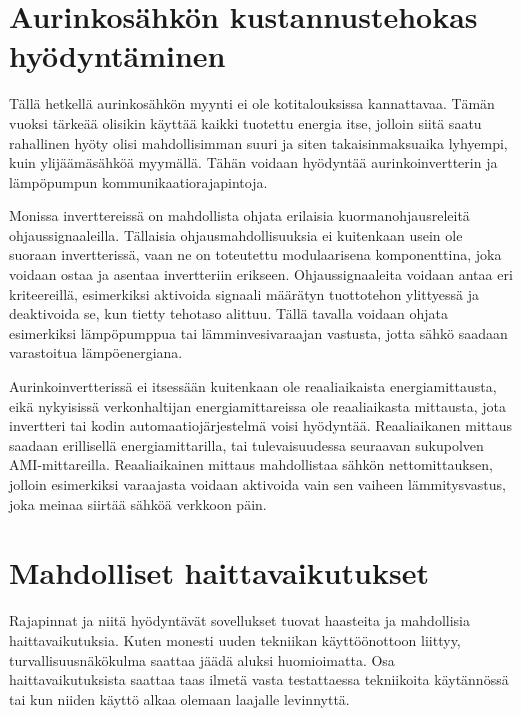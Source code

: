 \section{Aurinkosähkön kustannustehokas hyödyntäminen}

  Tällä hetkellä aurinkosähkön myynti ei ole kotitalouksissa kannattavaa. Tämän vuoksi tärkeää olisikin käyttää kaikki tuotettu energia itse, jolloin siitä saatu rahallinen hyöty olisi mahdollisimman suuri ja siten takaisinmaksuaika lyhyempi, kuin ylijäämäsähköä myymällä. Tähän voidaan hyödyntää aurinkoinvertterin ja lämpöpumpun kommunikaatiorajapintoja.

  Monissa inverttereissä on mahdollista ohjata erilaisia kuormanohjausreleitä ohjaussignaaleilla. Tällaisia ohjausmahdollisuuksia ei kuitenkaan usein ole suoraan invertterissä, vaan ne on toteutettu modulaarisena komponenttina, joka voidaan ostaa ja asentaa invertteriin erikseen. Ohjaussignaaleita voidaan antaa eri kriteereillä, esimerkiksi aktivoida signaali määrätyn tuottotehon ylittyessä ja deaktivoida se, kun tietty tehotaso alittuu. Tällä tavalla voidaan ohjata esimerkiksi lämpöpumppua tai lämminvesivaraajan vastusta, jotta sähkö saadaan varastoitua lämpöenergiana.

  Aurinkoinvertterissä ei itsessään kuitenkaan ole reaaliaikaista energiamittausta, eikä nykyisissä verkonhaltijan energiamittareissa ole reaaliaikasta mittausta, jota invertteri tai kodin automaatiojärjestelmä voisi hyödyntää. Reaaliaikanen mittaus saadaan erillisellä energiamittarilla, tai tulevaisuudessa seuraavan sukupolven AMI-mittareilla. Reaaliaikainen mittaus mahdollistaa sähkön nettomittauksen, jolloin esimerkiksi varaajasta voidaan aktivoida vain sen vaiheen lämmitysvastus, joka meinaa siirtää sähköä verkkoon päin.

  \section{Mahdolliset haittavaikutukset}

  Rajapinnat ja niitä hyödyntävät sovellukset tuovat haasteita ja mahdollisia haittavaikutuksia. Kuten monesti uuden tekniikan käyttöönottoon liittyy, turvallisuusnäkökulma saattaa jäädä aluksi huomioimatta. Osa haittavaikutuksista saattaa taas ilmetä vasta testattaessa tekniikoita käytännössä tai kun niiden käyttö alkaa olemaan laajalle levinnyttä.

